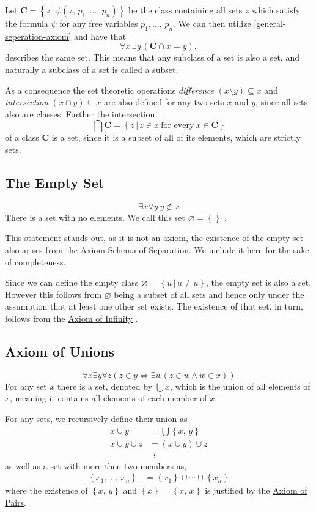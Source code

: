 \documentclass[../../main.tex]{subfiles}
\begin{document}
Let $\mathbf{C} = \left\{z \,\vert\, \psi(z,\, p_1,\ldots,\, p_n)\right\}$ be the class containing all sets $z$ which satisfy the formula $\psi$ for any free variables $p_1,\ldots,\, p_n$.
We can then utilize \eqref{general-seperation-axiom} and have that
$$\forall x \, \exists y \, \left(\mathbf{C} \cap x = y\right),$$
describes the same set.
This means that any subclass of a set is also a set, and naturally a subclass of a set is called a subset. 

As a consequence the set theoretic operations \textit{difference} $\left(x \setminus y\right) \subseteq x$ and \textit{intersection} $\left(x \cap y\right) \subseteq x$ are also defined for any two sets $x$ and $y$,
since all sets also are classes.
Further the intersection 
$$\bigcap \mathbf{C} = \left\{z \,\vert\, z \in x \ \text{for every}\ x \in \mathbf{C}\right\}$$
of a class $\mathbf{C}$ is a set, since it is a subset of all of its elements, which are strictly sets. \cite[pp.5-6]{Jec78}

\subsection{The Empty Set}\label{ZF4}
$$\exists x \forall y \ y \notin x$$
There is a set with no elements. We call this set $\varnothing = \left\{\right\}$ \cite[p.76]{Gol17}.

This statement stands out, as it is not an axiom, the existence of the empty set also arises from the \hyperref[ZF3]{Axiom Schema of Separation}.
We include it here for the sake of completeness.

Since we can define the empty class $\varnothing = \left\{u\, \vert\, u \neq u\right\}$, the empty set is also a set.
However this follows from $\varnothing$ being a subset of all sets and hence only under the assumption that at least one other set exists.
The existence of that set, in turn, follows from the \hyperref[ZF7]{Axiom of Infinity} \cite[p.6]{Jec78}.

\subsection{Axiom of Unions}\label{ZF5}
$$\forall x \exists y \forall z \left(z \in y \iff \exists w \left(z \in w \wedge w \in x\right)\right)$$
For any set $x$ there is a set, denoted by $\bigcup x$, which is the union of all elements of $x$,
meaning it contains all elements of each member of $x$.

For any sets, we recursively define their union as
\begin{align*}
    x \cup y &= \bigcup \left\{x,\, y\right\} \\
    x \cup y \cup z &= \left(x \cup y\right) \cup z \\
    &\,\,\, \vdots
\end{align*}
as well as a set with more then two members as,
\begin{align*}
    \left\{x_1,\ldots,\ x_n\right\} &= \left\{x_1\right\} \cup \cdots \cup \left\{x_n\right\}
\end{align*}
where the existence of $\left\{x,\, y\right\}$ and $\left\{x\right\} = \left\{x,\, x\right\}$ is justified by the \hyperref[ZF2]{Axiom of Pairs}. \cite[p.6]{Jec78}
\end{document}

